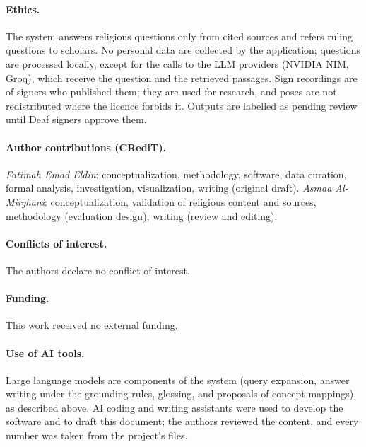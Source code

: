 \paragraph{Ethics.} The system answers religious questions only from cited sources and refers ruling questions to
scholars. No personal data are collected by the application; questions are processed locally, except for the calls to
the LLM providers (NVIDIA NIM, Groq), which receive the question and the retrieved passages. Sign recordings are of
signers who published them; they are used for research, and poses are not redistributed where the licence forbids it.
Outputs are labelled as pending review until Deaf signers approve them.

\paragraph{Author contributions (CRediT).} \emph{Fatimah Emad Eldin}: conceptualization, methodology, software, data
curation, formal analysis, investigation, visualization, writing (original draft). \emph{Asmaa Al-Mirghani}:
conceptualization, validation of religious content and sources, methodology (evaluation design), writing (review and
editing).

\paragraph{Conflicts of interest.} The authors declare no conflict of interest.

\paragraph{Funding.} This work received no external funding.

\paragraph{Use of AI tools.} Large language models are components of the system (query expansion, answer writing under
the grounding rules, glossing, and proposals of concept mappings), as described above. AI coding and writing assistants
were used to develop the software and to draft this document; the authors reviewed the content, and every number was
taken from the project's files.
